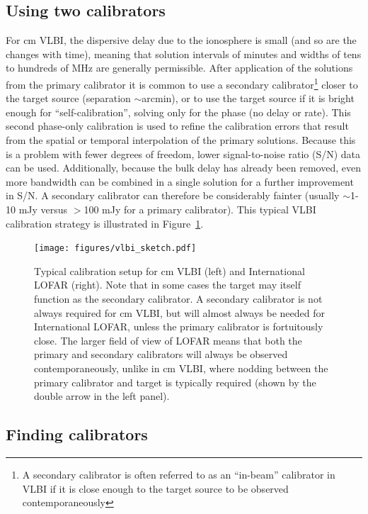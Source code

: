 \documentclass[graybox]{svmult}
\begin{document}
\subsection{Using two calibrators}

For cm VLBI, the dispersive delay due to the ionosphere is small (and so are
the changes with time), meaning that solution intervals of minutes and widths
of tens to hundreds of MHz are generally permissible.  After application of the
solutions from the primary calibrator it is common to use a secondary
calibrator\footnote{A secondary calibrator is often referred to as an
``in-beam'' calibrator in VLBI if it is close enough to the target source to be
observed contemporaneously} closer to the target source (separation
$\sim$arcmin), or to use the target source if it is bright enough for
``self-calibration'', solving only for the phase (no delay or rate). This
second phase-only calibration is used to refine the calibration errors that
result from the spatial or temporal interpolation of the primary solutions.
Because this is a problem with fewer degrees of freedom, lower signal-to-noise
ratio (S/N) data can be used.  Additionally, because the bulk delay has already
been removed, even more bandwidth can be combined in a single solution for a
further improvement in S/N.  A secondary calibrator can therefore be
considerably fainter (usually $\sim$1-10 mJy versus $>$100 mJy for a primary
calibrator).  This typical VLBI calibration strategy is illustrated in
Figure~\ref{fig:calstrategy}.

\begin{figure}[] %
\center
\texttt{[image: figures/vlbi\_sketch.pdf]}
\caption{Typical calibration setup for cm VLBI (left) and International LOFAR
(right).  Note that in some cases the target may itself function as the
secondary calibrator.  A secondary calibrator is not always required for cm
VLBI, but will almost always be needed for International LOFAR, unless the
primary calibrator is fortuitously close.  The larger field of view of LOFAR
means that both the primary and secondary calibrators will always be observed
contemporaneously, unlike in cm VLBI, where nodding between the primary
calibrator and target is typically required (shown by the double arrow in the
left panel).}
\label{fig:calstrategy}
\end{figure}

\subsection{Finding calibrators}\label{findcalib}
\end{document}
